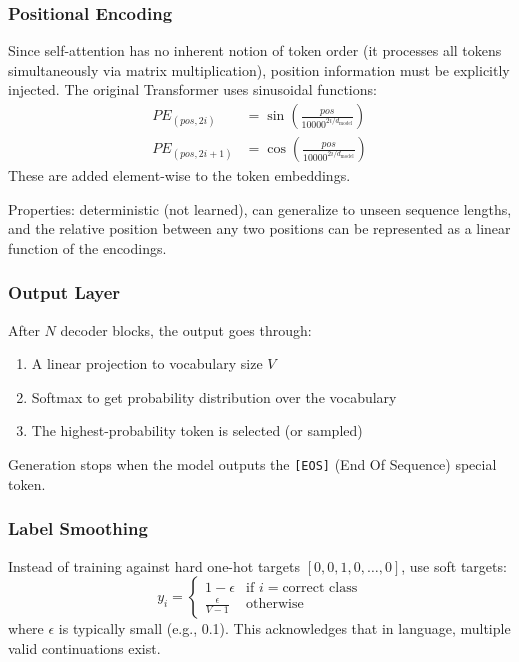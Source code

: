 \documentclass[11pt, a4paper]{article}
\begin{document}
\subsubsection{Positional Encoding}

\begin{defbox}
Since self-attention has no inherent notion of token order (it processes all tokens simultaneously via matrix multiplication), position information must be explicitly injected. The original Transformer uses sinusoidal functions:
\begin{align}
PE_{(pos, 2i)} &= \sin\!\left(\frac{pos}{10000^{2i/d_{\text{model}}}}\right) \\[4pt]
PE_{(pos, 2i+1)} &= \cos\!\left(\frac{pos}{10000^{2i/d_{\text{model}}}}\right)
\end{align}
These are added element-wise to the token embeddings.
\end{defbox}

Properties: deterministic (not learned), can generalize to unseen sequence lengths, and the relative position between any two positions can be represented as a linear function of the encodings.

\subsubsection{Output Layer}

After $N$ decoder blocks, the output goes through:
\begin{enumerate}[leftmargin=2em]
  \item A linear projection to vocabulary size $V$
  \item Softmax to get probability distribution over the vocabulary
  \item The highest-probability token is selected (or sampled)
\end{enumerate}

Generation stops when the model outputs the \texttt{[EOS]} (End Of Sequence) special token.

\subsubsection{Label Smoothing}

\begin{defbox}
Instead of training against hard one-hot targets $[0, 0, 1, 0, \ldots, 0]$, use soft targets:
\[
y_i = \begin{cases}
1 - \epsilon & \text{if } i = \text{correct class} \\
\frac{\epsilon}{V - 1} & \text{otherwise}
\end{cases}
\]
where $\epsilon$ is typically small (e.g., 0.1). This acknowledges that in language, multiple valid continuations exist.
\end{defbox}
\end{document}
